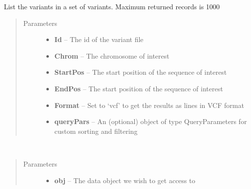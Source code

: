\documentclass[letterpaper,10pt,english]{sphinxmanual}
\begin{document}
\begin{fulllineitems}
\begin{fulllineitems}
\end{fulllineitems}


\begin{fulllineitems}
\label{Available modules:BaseSpacePy.api.BaseSpaceAPI.BaseSpaceAPI.filterVariantSet}
List the variants in a set of variants. Maximum returned records is 1000
\begin{quote}\begin{description}
\item[{Parameters}] \leavevmode\begin{itemize}
\item {} 
\textbf{Id} -- The id of the variant file

\item {} 
\textbf{Chrom} -- The chromosome of interest

\item {} 
\textbf{StartPos} -- The start position of the sequence of interest

\item {} 
\textbf{EndPos} -- The start position of the sequence of interest

\item {} 
\textbf{Format} -- Set to `vcf' to get the results as lines in VCF format

\item {} 
\textbf{queryPars} -- An (optional) object of type QueryParameters for custom sorting and filtering

\end{itemize}

\end{description}\end{quote}

\end{fulllineitems}


\begin{fulllineitems}
\label{Available modules:BaseSpacePy.api.BaseSpaceAPI.BaseSpaceAPI.getAccess}~\begin{quote}\begin{description}
\item[{Parameters}] \leavevmode\begin{itemize}
\item {} 
\textbf{obj} -- The data object we wish to get access to


\end{itemize}
\end{description}
\end{quote}
\end{fulllineitems}
\end{fulllineitems}
\end{document}
